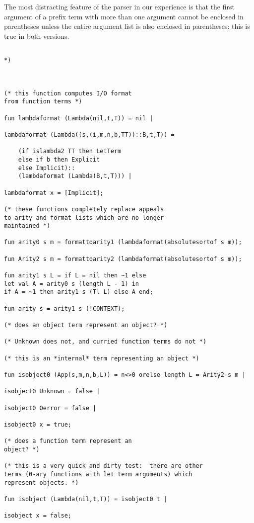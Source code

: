 \documentclass[12pt]{article}
\begin{document}
The most distracting feature of the parser in our experience  is that the first argument of a prefix term with more than one argument cannot be enclosed in parentheses unless the entire argument list is also enclosed in parentheses:  this is true in both versions.

\newpage


\begin{verbatim}

*)



(* this function computes I/O format
from function terms *)

fun lambdaformat (Lambda(nil,t,T)) = nil |

lambdaformat (Lambda((s,(i,m,n,b,TT))::B,t,T)) =

    (if islambda2 TT then LetTerm
	else if b then Explicit
	else Implicit)::
	(lambdaformat (Lambda(B,t,T))) |
	
lambdaformat x = [Implicit];

(* these functions completely replace appeals
to arity and format lists which are no longer
maintained *)

fun arity0 s m = formattoarity1 (lambdaformat(absolutesortof s m));

fun Arity2 s m = formattoarity2 (lambdaformat(absolutesortof s m));

fun arity1 s L = if L = nil then ~1 else 
let val A = arity0 s (length L - 1) in
if A = ~1 then arity1 s (Tl L) else A end;

fun arity s = arity1 s (!CONTEXT);

(* does an object term represent an object? *)

(* Unknown does not, and curried function terms do not *)

(* this is an *internal* term representing an object *)

fun isobject0 (App(s,m,n,b,L)) = n<>0 orelse length L = Arity2 s m |

isobject0 Unknown = false |

isobject0 Oerror = false |

isobject0 x = true;

(* does a function term represent an 
object? *)

(* this is a very quick and dirty test:  there are other
terms (0-ary functions with let term arguments) which
represent objects. *)

fun isobject (Lambda(nil,t,T)) = isobject0 t |

isobject x = false;


\end{verbatim}
\end{document}
